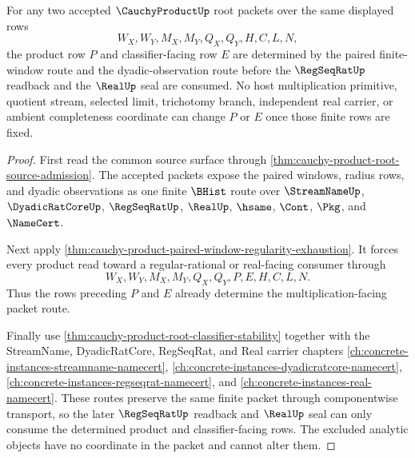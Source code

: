 \begin{theorem}
\label{thm:cauchy-product-root-product-row-determinacy}
For any two accepted $\CauchyProductUp$ root packets over the same displayed rows
$$
W_X,W_Y,M_X,M_Y,Q_X,Q_Y,H,C,L,N,
$$
the product row $P$ and classifier-facing row $E$ are determined by the paired finite-window route and the dyadic-observation route before the $\RegSeqRatUp$ readback and the $\RealUp$ seal are consumed. No host multiplication primitive, quotient stream, selected limit, trichotomy branch, independent real carrier, or ambient completeness coordinate can change $P$ or $E$ once those finite rows are fixed.
\end{theorem}
\begin{proof}
First read the common source surface through \autoref{thm:cauchy-product-root-source-admission}. The accepted packets expose the paired windows, radius rows, and dyadic observations as one finite $\BHist$ route over $\StreamNameUp$, $\DyadicRatCoreUp$, $\RegSeqRatUp$, $\RealUp$, $\hsame$, $\Cont$, $\Pkg$, and $\NameCert$.

Next apply \autoref{thm:cauchy-product-paired-window-regularity-exhaustion}. It forces every product read toward a regular-rational or real-facing consumer through
$$
W_X,W_Y,M_X,M_Y,Q_X,Q_Y,P,E,H,C,L,N.
$$
Thus the rows preceding $P$ and $E$ already determine the multiplication-facing packet route.

Finally use \autoref{thm:cauchy-product-root-classifier-stability} together with the StreamName, DyadicRatCore, RegSeqRat, and Real carrier chapters \autoref{ch:concrete-instances-streamname-namecert}, \autoref{ch:concrete-instances-dyadicratcore-namecert}, \autoref{ch:concrete-instances-regseqrat-namecert}, and \autoref{ch:concrete-instances-real-namecert}. These routes preserve the same finite packet through componentwise transport, so the later $\RegSeqRatUp$ readback and $\RealUp$ seal can only consume the determined product and classifier-facing rows. The excluded analytic objects have no coordinate in the packet and cannot alter them.
\end{proof}

